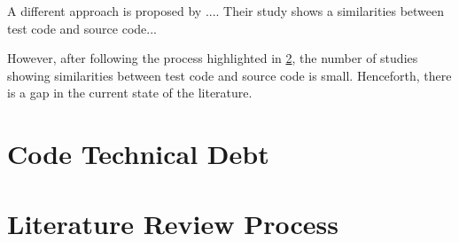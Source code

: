 A different approach is proposed by .... Their study shows a similarities between test code and source code...

However, after following the process highlighted in \ref{literature_review_process}, the number of studies showing similarities between test code and source code is small. Henceforth, there is a gap in the current state of the literature.


\section{Code Technical Debt} \label{code_td}

\section{Literature Review Process} \label{literature_review_process}